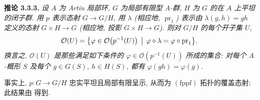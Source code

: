 \medskip
{}\label{cor:sga3-VIA-3.3.3}%
\noindent\textbf{推论 3.3.3.}
\textit{设 \(A\) 为 Artin 局部环, \(G\) 为局部有限型 \(A\)-群,
\(H\) 为 \(G\) 的在 \(A\) 上平坦的闭子群.
用 \(p\) 表示态射 \(G\to G/H\), 用 \(\lambda\)
(相应地, \(\operatorname{pr}_1\)) 表示由 \(\lambda(g,h)=gh\)
定义的态射 \(G\times H\to G\) (相应地, 投影 \(G\times H\to G\)).
则对 \(G/H\) 的每个开子集 \(U\),
\[
  \mathcal O(U)
  =
  \bigl\{
    \varphi\in\mathcal O\bigl(p^{-1}(U)\bigr)
    \,\bigm|\,
    \varphi\circ\lambda=\varphi\circ\operatorname{pr}_1
  \bigr\}.
\]
换言之, \(\mathcal O(U)\) 是那些满足如下条件的
\(\varphi\in\mathcal O(p^{-1}(U))\) 所成的集合:
对每个 \(A\)-概形 \(S\) 及每个 \(g\in G(S)\), \(h\in H(S)\),
都有 \(\varphi(gh)=\varphi(g)\).}

事实上, \(p:G\to G/H\) 忠实平坦且局部有限呈示,
从而为 \((\mathrm{fppf})\) 拓扑的覆盖态射;
此结果由 得到.
